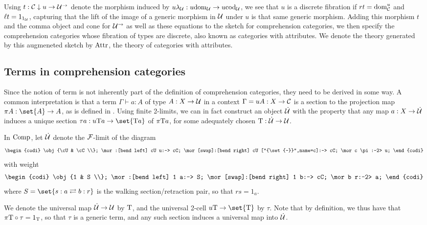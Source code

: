 \documentclass[../thesis.tex]{subfiles}
\begin{document}
Using $t : {\mathcal{C}} \mathrel{\downarrow} u \to {\mathcal{U}}^\to$ denote the morphism induced by $u\lambda_{\mathcal{U}} : u{\mathrm{dom}}_{\mathcal{U}} \to u{\mathrm{cod}}_{\mathcal{U}}$,
we see that $u$ is a discrete fibration if $rt = {\mathrm{dom}}^u_{\mathcal{C}}$ and $\ell t = 1_{1_{\mathcal{U}}}$, capturing that the lift
of the image of a generic morphism in ${\mathcal{U}}$ under $u$ is that same generic morphism. Adding this morphism $t$
and the comma object and cone for ${\mathcal{U}}^\to$ as well as these equations to the sketch for comprehension categories,
we then specify the comprehension categories whose fibration of types are discrete, also known as categories with
attributes. We denote the theory generated by this augmeneted sketch by ${\mathrm{Attr}}$, the theory of categories with
attributes.

\subsection{Terms in comprehension categories}\label{subsec:compcat terms}
Since the notion of term is not inherently part of the definition of comprehension categories, they need to be
derived in some way. A common interpretation is that a term $\Gamma \vdash a : A$ of type $A : X \to {\mathcal{U}}$ in
a context $\Gamma = uA : X \to {\mathcal{C}}$ is a section to the projection map $\pi A : \set{A} \to A$, as is defined
in \cite{jacobs1993}. Using finite 2-limits, we can in fact construct an object $\dot{{\mathcal{U}}}$ with the property
that any map $a : X \to \dot{{\mathcal{U}}}$ induces a unique section $\tau a : u\typ a \to \set{\typ a}$ of $\pi{{\mathrm{T}}} a$,
for some adequately chosen ${{\mathrm{T}}} : \dot{{\mathcal{U}}} \to {\mathcal{U}}$. 

\begin{definition}
  In ${\mathrm{Comp}}$, let $\dot{{\mathcal{U}}}$ denote the ${\mathcal{F}}$-limit of the diagram
  \[\begin{codi}
    \obj {\cU & \cC \\};
    \mor:[bend left] cU u:-> cC;
    \mor[swap]:[bend right] cU ["{\set{-}}",name=c]:-> cC;
    \mor c \pi:-2> u;
  \end{codi}\]
  with weight
  \[\begin{codi}
    \obj {1 & S \\};
    \mor:[bend left] 1 a:-> S;
    \mor[swap]:[bend right] 1 b:-> cC;
    \mor b r:-2> a;
  \end{codi}\]
  where $S = \set{s : a \rightleftarrows b : r}$ is the walking section/retraction pair, so that $rs = 1_a$.

  We denote the universal map $\dot{{\mathcal{U}}} \to {\mathcal{U}}$ by ${{\mathrm{T}}}$, and the universal 2-cell $u\typ \to \set{\typ}$
  by $\tau$. Note that by definition, we thus have that $\pi {{\mathrm{T}}} \circ \tau = 1_{{\mathrm{T}}}$, so that $\tau$ is
  a generic term, and any such section induces a universal map into $\dot{{\mathcal{U}}}$.
\end{definition}
\end{document}

